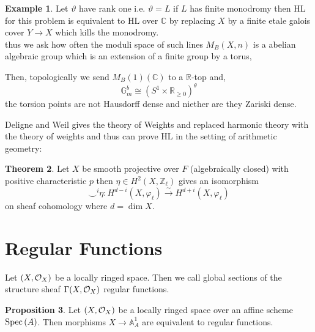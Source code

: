 \documentclass[12pt]{extarticle}
\newcommand{\Z}{\mathbb{Z}}
\newcommand{\R}{\mathbb{R}}
\theoremstyle{definition}
\newtheorem{theorem}{Theorem}[section]
\newtheorem{proposition}[theorem]{Proposition}
\newtheorem{example}[theorem]{Example}
\newenvironment{definition}[1][Definition:]{\begin{trivlist}
\item[\hskip \labelsep {\bfseries #1}]}{\end{trivlist}}
\newcommand{\C}{\mathbb{C}}
\begin{document}
\begin{example}
Let $\vartheta$ have rank one i.e. $\vartheta = L$ if $L$ has finite monodromy then HL for this problem is equivalent to HL over $\C$ by replacing $X$ by a finite etale galois cover $Y \to X$ which kills the monodromy. 
\bigskip\\
thus we ask how often the moduli space of such lines $M_B(X, n)$ is a abelian algebraic group which is an extension of a finite group by a torus,
\begin{center}
\end{center}
Then, topologically we send $M_B(1)(\C)$ to a $\R$-top and,
\[ \mathbb{G}_m^b \cong (S^1 \times \R_{\ge 0} )^{\theta} \]
the torsion points are not Hausdorff dense and niether are they Zariski dense. 
\end{example}

Deligne and Weil gives the theory of Weights and replaced harmonic theory with the theory of weights and thus can prove HL in the setting of arithmetic geometry:

\begin{theorem}
Let $X$ be smooth projective over $F$ (algebraically closed) with positive characteristic $p$ then $\eta \in H^2(X, \Z_\ell)$ gives an isomorphism
\[ \smile^i \eta : H^{d - i}(X, \varphi_\ell) \xrightarrow{\sim} H^{d + i}(X, \varphi_\ell) \]
on sheaf cohomology where $d = \dim{X}$. 
\end{theorem}

\section{Regular Functions}

\renewcommand{\A}{\mathbb{A}}
\newcommand{\val}{\mathrm{val}}

\begin{definition}
Let $(X, \mathcal{O}_{X})$ be a locally ringed space. Then we call global sections of the structure sheaf $\Gamma(X, \mathcal{O}_{X})$ regular functions.
\end{definition}

\begin{proposition}
Let $(X, \mathcal{O}_{X})$ be a locally ringed space over an affine scheme $\mathrm{Spec}\left(A\right)$. Then morphisms $X \to \A^1_A$ are equivalent to regular functions.
\end{proposition}
\end{document}
